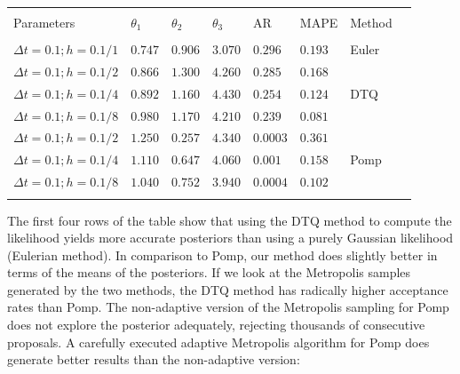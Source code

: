 \documentclass[graybox]{svmult}
\begin{document}
\setlength{\tabcolsep}{10pt}
\begin{table}[] \centering 
\begin{tabular}{llllllll} 
\\[-1.8ex]\hline 
\hline \\[-1.8ex] 
Parameters & $\theta_1$ & $\theta_2$ & $\theta_3$ & AR & MAPE & Method \\ 
\hline \\[-1.8ex] 
$\Delta t = 0.1; h = 0.1/1$ & $0.747$ & $0.906$ & $3.070$ & $0.296$ & $0.193$ & Euler \\ \hline
$\Delta t = 0.1; h = 0.1/2$ & $0.866$ & $1.300$ & $4.260$ & $0.285$ & $0.168$ &  \\ 
$\Delta t = 0.1; h = 0.1/4$ & $0.892$ & $1.160$ & $4.430$ & $0.254$ & $0.124$ & DTQ \\ 
$\Delta t = 0.1; h = 0.1/8$ & $0.980$ & $1.170$ & $4.210$ & $0.239$ & $0.081$ &  \\ \hline
$\Delta t = 0.1; h = 0.1/2$ & $1.250$ & $0.257$ & $4.340$ & $0.0003$ & $0.361$ &  \\ 
$\Delta t = 0.1; h = 0.1/4$ & $1.110$ & $0.647$ & $4.060$ & $0.001$ & $0.158$ & Pomp \\ 
$\Delta t = 0.1; h = 0.1/8$ & $1.040$ & $0.752$ & $3.940$ & $0.0004$ & $0.102$ &  \\ 
\hline \\[-1.8ex] 
\end{tabular} 
\end{table} 
\vspace{-5mm}
The first four rows of the table show that using the DTQ method to compute the likelihood yields more accurate posteriors than using a purely Gaussian likelihood (Eulerian method). In comparison to Pomp, our method does slightly better in terms of the means of the posteriors. If we look at the Metropolis samples generated by the two methods, the DTQ method has radically higher acceptance rates than Pomp. The non-adaptive version of the Metropolis sampling for Pomp does not explore the posterior adequately, rejecting thousands of consecutive proposals. A carefully executed adaptive Metropolis algorithm for Pomp does generate better results than the non-adaptive version:
\vspace{-4mm}
\setlength{\tabcolsep}{8pt}
\end{document}

